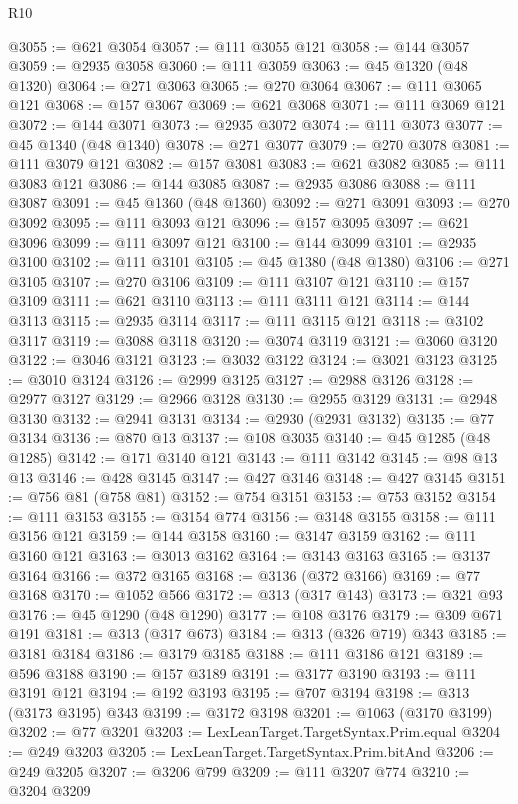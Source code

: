 \begin{lexlean}{R10}
\begin{coremodule}
@3055 := @621 @3054
@3057 := @111 @3055 @121
@3058 := @144 @3057
@3059 := @2935 @3058
@3060 := @111 @3059
@3063 := @45 @1320 (@48 @1320)
@3064 := @271 @3063
@3065 := @270 @3064
@3067 := @111 @3065 @121
@3068 := @157 @3067
@3069 := @621 @3068
@3071 := @111 @3069 @121
@3072 := @144 @3071
@3073 := @2935 @3072
@3074 := @111 @3073
@3077 := @45 @1340 (@48 @1340)
@3078 := @271 @3077
@3079 := @270 @3078
@3081 := @111 @3079 @121
@3082 := @157 @3081
@3083 := @621 @3082
@3085 := @111 @3083 @121
@3086 := @144 @3085
@3087 := @2935 @3086
@3088 := @111 @3087
@3091 := @45 @1360 (@48 @1360)
@3092 := @271 @3091
@3093 := @270 @3092
@3095 := @111 @3093 @121
@3096 := @157 @3095
@3097 := @621 @3096
@3099 := @111 @3097 @121
@3100 := @144 @3099
@3101 := @2935 @3100
@3102 := @111 @3101
@3105 := @45 @1380 (@48 @1380)
@3106 := @271 @3105
@3107 := @270 @3106
@3109 := @111 @3107 @121
@3110 := @157 @3109
@3111 := @621 @3110
@3113 := @111 @3111 @121
@3114 := @144 @3113
@3115 := @2935 @3114
@3117 := @111 @3115 @121
@3118 := @3102 @3117
@3119 := @3088 @3118
@3120 := @3074 @3119
@3121 := @3060 @3120
@3122 := @3046 @3121
@3123 := @3032 @3122
@3124 := @3021 @3123
@3125 := @3010 @3124
@3126 := @2999 @3125
@3127 := @2988 @3126
@3128 := @2977 @3127
@3129 := @2966 @3128
@3130 := @2955 @3129
@3131 := @2948 @3130
@3132 := @2941 @3131
@3134 := @2930 (@2931 @3132)
@3135 := @77 @3134
@3136 := @870 @13
@3137 := @108 @3035
@3140 := @45 @1285 (@48 @1285)
@3142 := @171 @3140 @121
@3143 := @111 @3142
@3145 := @98 @13 @13
@3146 := @428 @3145
@3147 := @427 @3146
@3148 := @427 @3145
@3151 := @756 @81 (@758 @81)
@3152 := @754 @3151
@3153 := @753 @3152
@3154 := @111 @3153
@3155 := @3154 @774
@3156 := @3148 @3155
@3158 := @111 @3156 @121
@3159 := @144 @3158
@3160 := @3147 @3159
@3162 := @111 @3160 @121
@3163 := @3013 @3162
@3164 := @3143 @3163
@3165 := @3137 @3164
@3166 := @372 @3165
@3168 := @3136 (@372 @3166)
@3169 := @77 @3168
@3170 := @1052 @566
@3172 := @313 (@317 @143)
@3173 := @321 @93
@3176 := @45 @1290 (@48 @1290)
@3177 := @108 @3176
@3179 := @309 @671 @191
@3181 := @313 (@317 @673)
@3184 := @313 (@326 @719) @343
@3185 := @3181 @3184
@3186 := @3179 @3185
@3188 := @111 @3186 @121
@3189 := @596 @3188
@3190 := @157 @3189
@3191 := @3177 @3190
@3193 := @111 @3191 @121
@3194 := @192 @3193
@3195 := @707 @3194
@3198 := @313 (@3173 @3195) @343
@3199 := @3172 @3198
@3201 := @1063 (@3170 @3199)
@3202 := @77 @3201
@3203 := LexLeanTarget.TargetSyntax.Prim.equal
@3204 := @249 @3203
@3205 := LexLeanTarget.TargetSyntax.Prim.bitAnd
@3206 := @249 @3205
@3207 := @3206 @799
@3209 := @111 @3207 @774
@3210 := @3204 @3209

\end{coremodule}
\end{lexlean}
